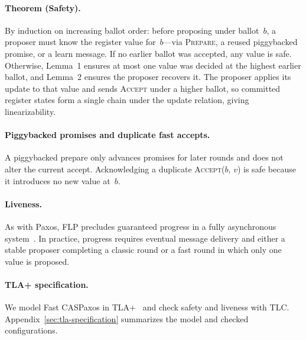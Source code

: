 \paragraph{Theorem (Safety).}
By induction on increasing ballot order: before proposing under ballot~$b$, a proposer must know the register value for~$b$---via \textsc{Prepare}, a reused piggybacked promise, or a learn message.
If no earlier ballot was accepted, any value is safe.
Otherwise, Lemma~1 ensures at most one value was decided at the highest earlier ballot, and Lemma~2 ensures the proposer recovers it.
The proposer applies its update to that value and sends \textsc{Accept} under a higher ballot, so committed register states form a single chain under the update relation, giving linearizability.

\paragraph{Piggybacked promises and duplicate fast accepts.}
A piggybacked prepare only advances promises for later rounds and does not alter the current accept.
Acknowledging a duplicate \textsc{Accept}($b$, $v$) is safe because it introduces no new value at~$b$.

\paragraph{Liveness.}
As with Paxos, FLP precludes guaranteed progress in a fully asynchronous system~\cite{fischer_jacm85}.
In practice, progress requires eventual message delivery and either a stable proposer completing a classic round or a fast round in which only one value is proposed.

\paragraph{TLA+ specification.}
We model Fast CASPaxos in TLA+~\cite{lamport_tla} and check safety and liveness with TLC.
Appendix~\ref{sec:tla-specification} summarizes the model and checked configurations.
